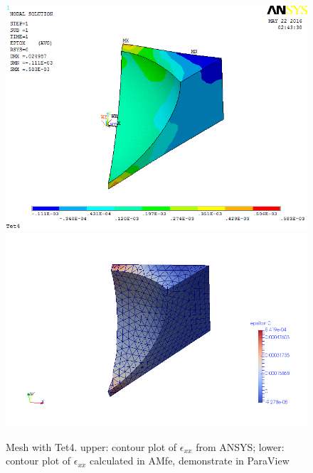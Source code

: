 \begin{figure}[htbp]
	\begin{center}
		\includegraphics[width=13cm,clip]{Tet4Exx.png} 		
		\includegraphics[width=13cm,clip]{Tet4ExxP.png} 		
		\caption{Mesh with Tet4. upper: contour plot of $\epsilon_{xx}$ from ANSYS; lower: contour plot of $\epsilon_{xx}$ calculated in AMfe, demonstrate in ParaView} \label{fig: Tet4Exx}
	\end{center}
\end{figure}
\clearpage 

